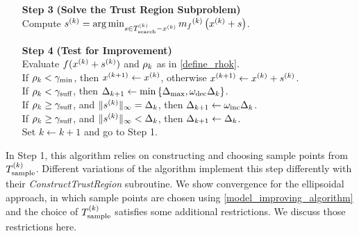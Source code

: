 {\begin{fullwidth}[leftmargin=0in, rightmargin=0in, width=\linewidth-0.35in]
\begin{flushleft}
\begin{algorithm}[H]
\begin{itemize}
        
        \item[\textbf{Step 3}] \textbf{(Solve the Trust Region Subproblem)} \\
            Compute ${{s}^{(k)}} = \operatorname*{arg\,min}_{s \in {T_{\text{search}}^{(k)}} - x^{(k)}} {{m}_f}^{(k)}\left(x^{(k)} + s\right)$. 
            
 		\end{itemize}
 		\end{algorithm}
 		
 		\newpage
 		
 		\begin{algorithm}[H]
 		\begin{itemize}
        \item[\textbf{Step 4}] \textbf{(Test for Improvement)} \\
            Evaluate $f(x^{(k)} + {{s}^{(k)}})$ and $\rho_k$ as in \cref{define_rhok}. \\
			If $\rho_k < \gamma_{\textrm{min}}$, then ${{x}^{(k+1)}} \gets x^{(k)}$, otherwise ${{x}^{(k+1)}} \gets x^{(k)} + {{s}^{(k)}}$. \\
            If $\rho_k < \gamma_{\textrm{suff}}$, then $\Delta_{k+1} \gets \min\left\{{\Delta_{\textrm{max}}}, \omega_{\text{dec}}\Delta_k\right\}$. \\
            If $\rho_k \ge \gamma_{\textrm{suff}}$, and $\|{{s}^{(k)}}\|_{\infty} = \Delta_k$, then $\Delta_{k+1} \gets \omega_{\text{inc}}\Delta_k$. \\
            If $\rho_k \ge \gamma_{\textrm{suff}}$, and $\|{{s}^{(k)}}\|_{\infty} < \Delta_k$, then $\Delta_{k+1} \gets \Delta_k$. \\
            Set $k \gets k+1$ and go to Step 1.
    \end{itemize}
\end{algorithm}

\end{flushleft}
\end{fullwidth}
}


In Step 1, this algorithm relies on constructing and choosing sample points from ${T_{\text{sample}}^{(k)}}$.
Different variations of the algorithm implement this step differently with their \emph{ConstructTrustRegion} subroutine.
We show convergence for the ellipsoidal approach, in which sample points are chosen using \cref{model_improving_algorithm}
and the choice of ${T_{\text{sample}}^{(k)}}$ satisfies some additional restrictions.
We discuss those restrictions here.


